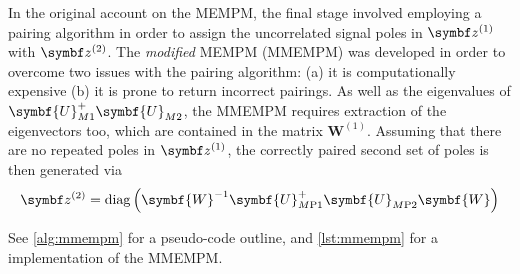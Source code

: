 In the original account on the \ac{MEMPM}, the final stage involved employing a
pairing algorithm in order to assign the uncorrelated signal poles in $\bdzone$
with $\bdztwo$\cite{Hua1992}. The \emph{modified} \ac{MEMPM} (\acs{MMEMPM}) was
developed in order to overcome two issues with the pairing algorithm: (a) it is
computationally expensive (b) it is prone to return incorrect
pairings\cite{Chen2007}.  As well as the eigenvalues of
$\symbf{U}^{+}_{M1}\symbf{U}_{M2}^{\vphantom{+}}$, the \ac{MMEMPM} requires
extraction of the eigenvectors too, which are contained in the matrix
$\symbf{W}^{(1)}$. Assuming that there are no repeated poles in $\bdzone$, the
correctly paired second set of poles is then generated via
\begin{equation}
    \bdztwo = \diag\left(
        \symbf{W}^{-1}
        \symbf{U}_{M\text{P}1}^+
        \symbf{U}_{M\text{P}2}^{\vphantom{+}}
        \symbf{W}
    \right)
\end{equation}

See \cref{alg:mmempm} for a pseudo-code outline, and \cref{lst:mmempm} for a
\Python implementation of the \ac{MMEMPM}.

